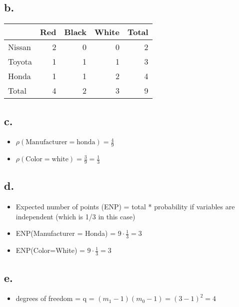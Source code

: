 \documentclass[11pt]{article}
\begin{document}
\subsection*{b.}
\label{sec:orge03ec8a}
\begin{center}
\begin{tabular}{l|rrr|r}
 & Red & Black & White & Total\\
\hline
Nissan & 2 & 0 & 0 & 2\\
Toyota & 1 & 1 & 1 & 3\\
Honda & 1 & 1 & 2 & 4\\
\hline
Total & 4 & 2 & 3 & 9\\
\end{tabular}
\end{center}
\subsection*{c.}
\label{sec:org9a552b2}
\begin{itemize}
\item \(\rho(\text{Manufacturer}=\text{honda}) = \frac{4}{9}\)
\item \(\rho(\text{Color}=\text{white}) = \frac{3}{9} = \frac{1}{3}\)
\end{itemize}
\subsection*{d.}
\label{sec:orgc879e23}
\begin{itemize}
\item Expected number of points (ENP) = total * probability if variables are
independent (which is 1/3 in this case)
\item ENP(Manufacturer = Honda) = \(9 \cdot \frac{1}{3} = 3\)
\item ENP(Color=White) = \(9 \cdot \frac{1}{3} = 3\)
\end{itemize}
\subsection*{e.}
\label{sec:orgc2171d5}
\begin{itemize}
\item degrees of freedom = q = \((m_1-1)(m_0-1) = (3-1)^2 = 4\)
\end{itemize}
\end{document}
